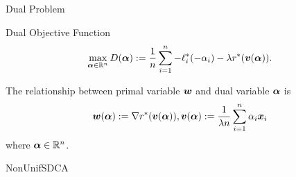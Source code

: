\begin{frame}{Dual Problem}
\begin{block}{Dual Objective Function}
\begin{equation*}\label{eq:dual}
\max_{\bm{\alpha}\in \mathbb{R}^n} D(\bm{\alpha}):=\frac1n \sum_{i=1}^n -\ell_i^*(-\alpha_i) - \lambda r^*(\bm{v}(\bm{\alpha})).  
\end{equation*}
\end{block}
The relationship between primal variable $\bm{w}$ and dual variable $\bm{\alpha}$ is
\begin{equation*}\label{eq:wdualupdate}
    \bm{w}(\bm{\alpha}) := \nabla r^*(\bm{v}(\bm{\alpha})), \bm{v}(\bm{\alpha}):=\frac{1}{\lambda n} \sum_{i=1}^n \alpha_i\bm{x}_i
\end{equation*}
where $\bm{\alpha}\in \mathbb{R}^n$.
\end{frame}

\begin{frame}{NonUnifSDCA}
\begin{algorithm}[H]
    \label{alg:SDCA}
    \caption{Non-Uniform Stochastic Dual Coordinate Ascent}
    \SetAlgoLined
\end{algorithm}
\end{frame}
